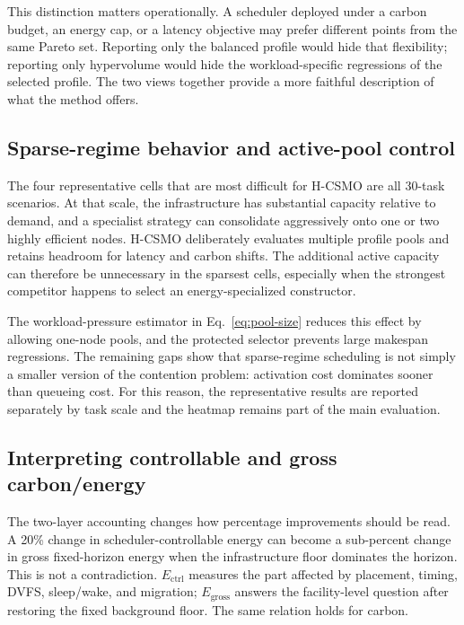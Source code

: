\documentclass[preprint,12pt]{elsarticle}
\newcommand{\method}{H-CSMO\xspace}
\begin{document}
This distinction matters operationally. A scheduler deployed under a carbon budget, an energy cap, or a latency objective may prefer different points from the same Pareto set. Reporting only the balanced profile would hide that flexibility; reporting only hypervolume would hide the workload-specific regressions of the selected profile. The two views together provide a more faithful description of what the method offers.

\subsection{Sparse-regime behavior and active-pool control}

The four representative cells that are most difficult for \method are all 30-task scenarios. At that scale, the infrastructure has substantial capacity relative to demand, and a specialist strategy can consolidate aggressively onto one or two highly efficient nodes. \method deliberately evaluates multiple profile pools and retains headroom for latency and carbon shifts. The additional active capacity can therefore be unnecessary in the sparsest cells, especially when the strongest competitor happens to select an energy-specialized constructor.

The workload-pressure estimator in Eq.~\eqref{eq:pool-size} reduces this effect by allowing one-node pools, and the protected selector prevents large makespan regressions. The remaining gaps show that sparse-regime scheduling is not simply a smaller version of the contention problem: activation cost dominates sooner than queueing cost. For this reason, the representative results are reported separately by task scale and the heatmap remains part of the main evaluation.

\subsection{Interpreting controllable and gross carbon/energy}

The two-layer accounting changes how percentage improvements should be read. A 20\% change in scheduler-controllable energy can become a sub-percent change in gross fixed-horizon energy when the infrastructure floor dominates the horizon. This is not a contradiction. $E_{\mathrm{ctrl}}$ measures the part affected by placement, timing, DVFS, sleep/wake, and migration; $E_{\mathrm{gross}}$ answers the facility-level question after restoring the fixed background floor. The same relation holds for carbon.
\end{document}
